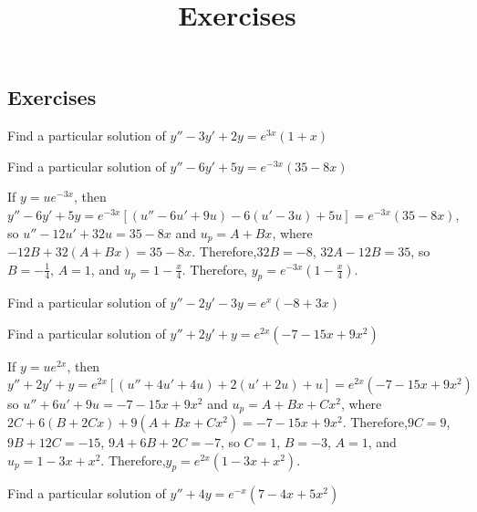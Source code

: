 \documentclass{ximera}
\title{Exercises} \license{CC BY-NC-SA 4.0}
\begin{document}
\begin{abstract}
\end{abstract}
\maketitle

\begin{onlineOnly}
\section*{Exercises}
\end{onlineOnly}


\begin{problem}\label{exer:5.4.1} Find a particular
solution of $y''-3y'+2y=e^{3x}(1+x)$
\end{problem}
 \begin{problem}\label{exer:5.4.2} Find a particular
solution of $y''-6y'+5y=e^{-3x}(35-8x)$

\begin{solution}
If $y=ue^{-3x}$, then
$y''-6y'+5y=e^{-3x}\left[(u''-6u'+9u)-6(u'-3u)+5u\right]=
e^{-3x}(35-8x)$, so $u''-12u'+32u =35-8x$ and $u_p=A+Bx$, where
$-12B+32(A+Bx)=35-8x$. Therefore,$32B=-8$, $32A-12B=35$, so
$B=-\frac{1}{4}$, $A=1$, and $u_p=1-\frac{x}{4}$. Therefore,
$y_p=e^{-3x}\left(1-\frac{x}{4}\right)$.
\end{solution}
\end{problem}

\begin{problem}\label{exer:5.4.3} Find a particular
solution of $y''-2y'-3y=e^x(-8+3x)$
\end{problem}

\begin{problem}\label{exer:5.4.4} Find a particular
solution of $y''+2y'+y=e^{2x}(-7-15x+9x^2)$
\begin{solution}
If $y=ue^{2x}$, then
$y''+2y'+y=e^{2x}\left[(u''+4u'+4u)+2(u'+2u)+u\right]=
e^{2x}(-7-15x+9x^2)$ so $u''+6u'+9u =-7-15x+9x^2$ and $u_p=A+Bx+Cx^2$,
where $2C+6(B+2Cx)+9(A+Bx+Cx^2)=-7-15x+9x^2$. Therefore,$9C=9$,
$9B+12C=-15$, $9A+6B+2C=-7$, so $C=1$, $B=-3$, $A=1$, and
$u_p=1-3x+x^2$. Therefore,$y_p=e^{2x}(1-3x+x^2)$.
\end{solution}
\end{problem}

\begin{problem}\label{exer:5.4.5} Find a particular
solution of $y''+4y=e^{-x}(7-4x+5x^2)$
\end{problem}
\end{document}
